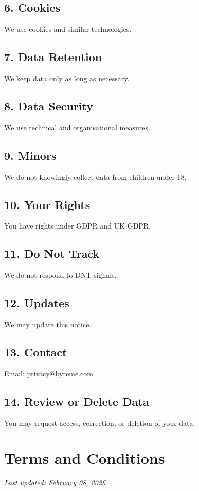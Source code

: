 \documentclass[11pt, a4paper]{report}
\begin{document}
\section*{6. Cookies}
We use cookies and similar technologies.

\section*{7. Data Retention}
We keep data only as long as necessary.

\section*{8. Data Security}
We use technical and organisational measures.

\section*{9. Minors}
We do not knowingly collect data from children under 18.

\section*{10. Your Rights}
You have rights under GDPR and UK GDPR.

\section*{11. Do Not Track}
We do not respond to DNT signals.

\section*{12. Updates}
We may update this notice.

\section*{13. Contact}
Email: privacy@byteme.com

\section*{14. Review or Delete Data}
You may request access, correction, or deletion of your data.

\chapter{Terms and Conditions}
\textit{Last updated: February 08, 2026}
\bigskip
\end{document}
